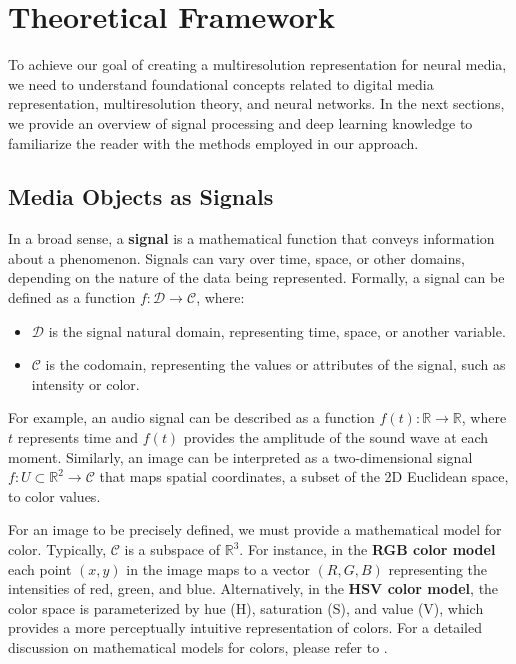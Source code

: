\chapter{Theoretical Framework}

To achieve our goal of creating a multiresolution representation for neural media, we need to understand foundational concepts related to digital media representation, multiresolution theory, and neural networks. In the next sections, we provide an overview of signal processing and deep learning knowledge to familiarize the reader with the methods employed in our approach.


\section{Media Objects as Signals}

In a broad sense, a \textbf{signal} is a mathematical function that conveys information about a phenomenon. Signals can vary over time, space, or other domains, depending on the nature of the data being represented. Formally, a signal can be defined as a function \( f: \mathcal{D} \to \mathcal{C} \), where:

\begin{itemize}
  \item \( \mathcal{D} \) is the signal natural domain, representing time, space, or another variable.
  \item \( \mathcal{C} \) is the codomain, representing the values or attributes of the signal, such as intensity or color.
\end{itemize}

For example, an audio signal can be described as a function \( f(t): \mathbb{R} \to \mathbb{R} \), where \( t \) represents time and \( f(t) \) provides the amplitude of the sound wave at each moment. Similarly, an image can be interpreted as a two-dimensional signal \( f: U \subset \mathbb{R}^2 \to \mathcal{C} \) that maps spatial coordinates, a subset of the 2D Euclidean space, to color values. 

For an image to be precisely defined, we must provide a mathematical model for color. Typically, $\mathcal{C}$ is a subspace of $\mathbb{R}^3$. For instance, in the \textbf{RGB color model} each point \( (x, y) \) in the image maps to a vector \( (R, G, B) \) representing the intensities of red, green, and blue. Alternatively, in the \textbf{HSV color model}, the color space is parameterized by hue (H), saturation (S), and value (V), which provides a more perceptually intuitive representation of colors. For a detailed discussion on mathematical models for colors, please refer to \cite{ipcgVelho2014}.



